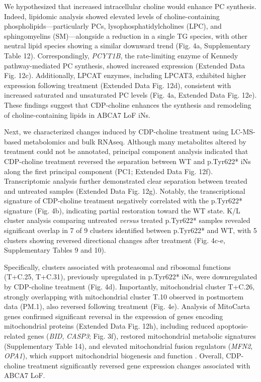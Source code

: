 We hypothesized that increased intracellular choline would enhance PC synthesis. Indeed, lipidomic analysis showed elevated levels of choline-containing phospholipids—particularly PCs, lysophosphatidylcholines (LPC), and sphingomyelins (SM)—alongside a reduction in a single TG species, with other neutral lipid species showing a similar downward trend (Fig. 4a, Supplementary Table 12). Correspondingly, \textit{PCYT1B}, the rate-limiting enzyme of Kennedy pathway-mediated PC synthesis, showed increased expression (Extended Data Fig. 12c). Additionally, LPCAT enzymes, including LPCAT3, exhibited higher expression following treatment (Extended Data Fig. 12d), consistent with increased saturated and unsaturated PC levels (Fig. 4a, Extended Data Fig. 12e). These findings suggest that CDP-choline enhances the synthesis and remodeling of choline-containing lipids in ABCA7 LoF iNs.

Next, we characterized changes induced by CDP-choline treatment using LC-MS-based metabolomics and bulk RNAseq. Although many metabolites altered by treatment could not be annotated, principal component analysis indicated that CDP-choline treatment reversed the separation between WT and p.Tyr622* iNs along the first principal component (PC1; Extended Data Fig. 12f). Transcriptomic analysis further demonstrated clear separation between treated and untreated samples (Extended Data Fig. 12g). Notably, the transcriptional signature of CDP-choline treatment negatively correlated with the p.Tyr622* signature (Fig. 4b), indicating partial restoration toward the WT state. K/L cluster analysis comparing untreated \textit{versus} treated p.Tyr622* samples revealed significant overlap in 7 of 9 clusters identified between p.Tyr622* and WT, with 5 clusters showing reversed directional changes after treatment (Fig. 4c-e, Supplementary Tables 9 and 10).

Specifically, clusters associated with proteasomal and ribosomal functions (T+C.25, T+C.31), previously upregulated in p.Tyr622* iNs, were downregulated by CDP-choline treatment (Fig. 4d). Importantly, mitochondrial cluster T+C.26, strongly overlapping with mitochondrial cluster T.10 observed in postmortem data (PM.1), also reversed following treatment (Fig. 4e). Analysis of MitoCarta genes confirmed significant reversal in the expression of genes encoding mitochondrial proteins (Extended Data Fig. 12h), including reduced apoptosis-related genes (\textit{BID}, \textit{CASP3}; Fig. 3f), restored mitochondrial metabolic signatures (Supplementary Table 14), and elevated mitochondrial fusion regulators (\textit{MFN2}, \textit{OPA1}), which support mitochondrial biogenesis and function \supercite{Westermann2010-au}. Overall, CDP-choline treatment significantly reversed gene expression changes associated with ABCA7 LoF.

